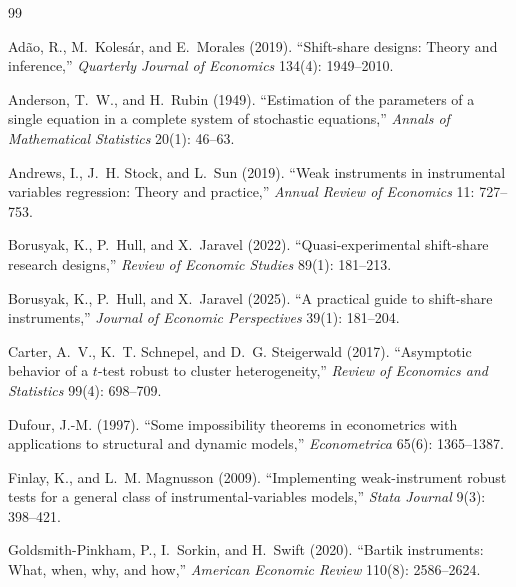 \documentclass{article}
\theoremstyle{plain}
\theoremstyle{definition}
\theoremstyle{remark}
\begin{document}
\begin{thebibliography}{99}

Ad\~ao, R., M.~Koles\'ar, and E.~Morales (2019).
``Shift-share designs: Theory and inference,''
\emph{Quarterly Journal of Economics} 134(4): 1949--2010.

Anderson, T.~W., and H.~Rubin (1949).
``Estimation of the parameters of a single equation in a complete system of
stochastic equations,''
\emph{Annals of Mathematical Statistics} 20(1): 46--63.

Andrews, I., J.~H. Stock, and L.~Sun (2019).
``Weak instruments in instrumental variables regression: Theory and practice,''
\emph{Annual Review of Economics} 11: 727--753.

Borusyak, K., P.~Hull, and X.~Jaravel (2022).
``Quasi-experimental shift-share research designs,''
\emph{Review of Economic Studies} 89(1): 181--213.

Borusyak, K., P.~Hull, and X.~Jaravel (2025).
``A practical guide to shift-share instruments,''
\emph{Journal of Economic Perspectives} 39(1): 181--204.

Carter, A.~V., K.~T. Schnepel, and D.~G. Steigerwald (2017).
``Asymptotic behavior of a $t$-test robust to cluster heterogeneity,''
\emph{Review of Economics and Statistics} 99(4): 698--709.

Dufour, J.-M. (1997).
``Some impossibility theorems in econometrics with applications to structural
and dynamic models,''
\emph{Econometrica} 65(6): 1365--1387.

Finlay, K., and L.~M. Magnusson (2009).
``Implementing weak-instrument robust tests for a general class of
instrumental-variables models,''
\emph{Stata Journal} 9(3): 398--421.

Goldsmith-Pinkham, P., I.~Sorkin, and H.~Swift (2020).
``Bartik instruments: What, when, why, and how,''
\emph{American Economic Review} 110(8): 2586--2624.


\end{thebibliography}
\end{document}
